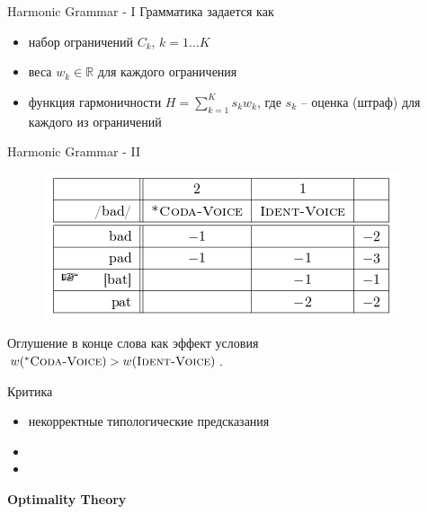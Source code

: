 \documentclass{beamer}
\begin{document}
\begin{frame}{Harmonic Grammar - I}
Грамматика задается как\\
\bigskip
\begin{itemize}
	\item набор ограничений $C_k$, $k = 1 \dots K$
	\medskip
	\item веса $w_k \in \mathbb{R}$ для каждого ограничения
	\medskip
	\item функция гармоничности $H = \sum_{k=1}^{K} s_k w_k$, где $s_k$ -- оценка (штраф) для каждого из ограничений
\end{itemize}
\end{frame}

\begin{frame}{Harmonic Grammar - II}
\begin{center}
	\begin{figure}[H]
		\includegraphics[scale=0.6]{hg_tableau1.png} 
	\end{figure}
\end{center}
\medskip
Оглушение в конце слова как эффект условия $w(^{*}\textsc{Coda-Voice}) > w(\textsc{Ident-Voice})$.
\end{frame}

\begin{frame}{Критика}
\begin{itemize}
	\item некорректные типологические предсказания
	\medskip
	\item 
	\medskip
	\item 
\end{itemize}
\end{frame}

\begin{frame}{}
\begin{center}
	\textbf{Optimality Theory}
\end{center}
\end{frame}
\end{document}
